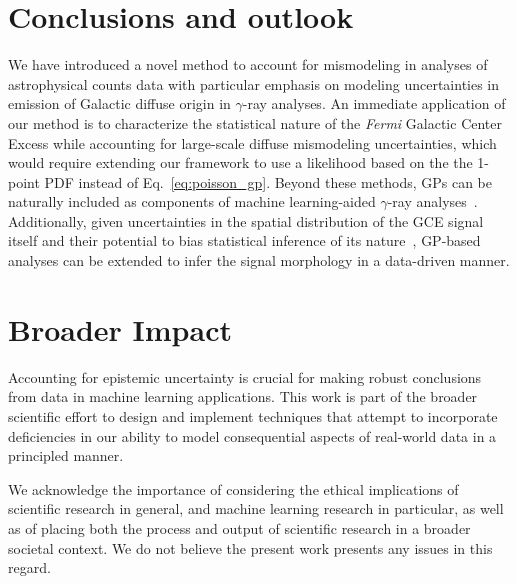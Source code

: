 \documentclass[]{article}
\begin{document}
\section{Conclusions and outlook}
\label{sec:conclusions}

We have introduced a novel method to account for mismodeling in analyses of astrophysical counts data with particular emphasis on modeling uncertainties in emission of Galactic diffuse origin in $\gamma$-ray analyses. An immediate application of our method is to characterize the statistical nature of the \emph{Fermi} Galactic Center Excess while accounting for large-scale diffuse mismodeling uncertainties, which would require extending our framework to use a likelihood based on the the 1-point PDF instead of Eq.~\eqref{eq:poisson_gp}. Beyond these methods, GPs can be naturally included as components of machine learning-aided $\gamma$-ray analyses~\cite{List:2020mzd,Caron:2017udl}. Additionally, given uncertainties in the spatial distribution of the GCE signal itself and their potential to bias statistical inference of its nature~\cite{Leane:2020nmi,Leane:2020pfc}, GP-based analyses can be extended to infer the signal morphology in a data-driven manner. 

\section*{Broader Impact}
\label{sec:impact}

Accounting for epistemic uncertainty is crucial for making robust conclusions from data in machine learning applications. This work is part of the broader scientific effort to design and implement techniques that attempt to incorporate deficiencies in our ability to model consequential aspects of real-world data in a principled manner.

We acknowledge the importance of considering the ethical implications of scientific research in general, and machine learning research in particular, as well as of placing both the process and output of scientific research in a broader societal context. We do not believe the present work presents any issues in this regard. 
\end{document}
